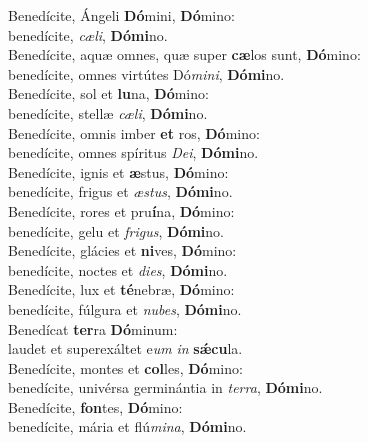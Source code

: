 \evenverse Benedícite, Ángeli \textbf{Dó}mini, \textbf{Dó}mino:~\*\\
\evenverse benedícite, \textit{cæ}\textit{li}, \textbf{Dó}\textbf{mi}no.\\
\oddverse Benedícite, aquæ omnes, quæ super \textbf{cæ}los sunt, \textbf{Dó}mino:~\*\\
\oddverse benedícite, omnes virtútes Dó\textit{mi}\textit{ni}, \textbf{Dó}\textbf{mi}no.\\
\evenverse Benedícite, sol et \textbf{lu}na, \textbf{Dó}mino:~\*\\
\evenverse benedícite, stellæ \textit{cæ}\textit{li}, \textbf{Dó}\textbf{mi}no.\\
\oddverse Benedícite, omnis imber \textbf{et} ros, \textbf{Dó}mino:~\*\\
\oddverse benedícite, omnes spíritus \textit{De}\textit{i}, \textbf{Dó}\textbf{mi}no.\\
\evenverse Benedícite, ignis et \textbf{æ}stus, \textbf{Dó}mino:~\*\\
\evenverse benedícite, frigus et \textit{æ}\textit{stus}, \textbf{Dó}\textbf{mi}no.\\
\oddverse Benedícite, rores et pru\textbf{í}na, \textbf{Dó}mino:~\*\\
\oddverse benedícite, gelu et \textit{fri}\textit{gus}, \textbf{Dó}\textbf{mi}no.\\
\evenverse Benedícite, glácies et \textbf{ni}ves, \textbf{Dó}mino:~\*\\
\evenverse benedícite, noctes et \textit{di}\textit{es}, \textbf{Dó}\textbf{mi}no.\\
\oddverse Benedícite, lux et \textbf{té}nebræ, \textbf{Dó}mino:~\*\\
\oddverse benedícite, fúlgura et \textit{nu}\textit{bes}, \textbf{Dó}\textbf{mi}no.\\
\evenverse Benedícat \textbf{ter}ra \textbf{Dó}minum:~\*\\
\evenverse laudet et superexáltet e\textit{um} \textit{in} \textbf{sǽ}\textbf{cu}la.\\
\oddverse Benedícite, montes et \textbf{col}les, \textbf{Dó}mino:~\*\\
\oddverse benedícite, univérsa germinántia in \textit{ter}\textit{ra}, \textbf{Dó}\textbf{mi}no.\\
\evenverse Benedícite, \textbf{fon}tes, \textbf{Dó}mino:~\*\\
\evenverse benedícite, mária et flú\textit{mi}\textit{na}, \textbf{Dó}\textbf{mi}no.\\
